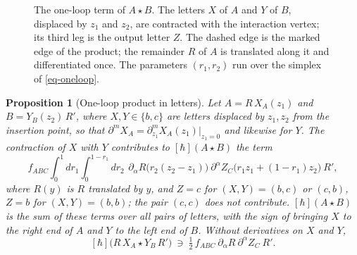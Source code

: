 \documentclass[11pt]{article}
\numberwithin{equation}{section}
\numberwithin{figure}{section}
\numberwithin{table}{section}
\newtheorem{proposition}[theorem]{Proposition}
\theoremstyle{definition}
\begin{document}
\begin{figure}[H]
\centering
{}
\caption{The one-loop term of $A\star B$. The letters $X$ of $A$ and $Y$ of $B$, displaced by $z_1$ and $z_2$, are contracted with the interaction vertex; its third leg is the output letter $Z$. The dashed edge is the marked edge of the product; the remainder $R$ of $A$ is translated along it and differentiated once. The parameters $(r_1,r_2)$ run over the simplex of \eqref{eq-oneloop}.}
\label{fig-triangle}
\end{figure}

\begin{proposition}[One-loop product in letters]\label{prop-oneloop}
Let $A=R\,X_A(z_1)$ and $B=Y_B(z_2)\,R'$, where $X,Y\in\{b,c\}$ are letters displaced by $z_1,z_2$ from the insertion point, so that $\partial^mX_A=\partial_{z_1}^mX_A(z_1)|_{z_1=0}$ and likewise for $Y$. The contraction of $X$ with $Y$ contributes to $[\hbar](A\star B)$ the term
\begin{equation}\label{eq-oneloop}
f_{ABC}\int_0^1\!dr_1\int_0^{1-r_1}\!dr_2\ \,
\partial_\alpha R\big(r_2(z_2-z_1)\big)\ \partial^\alpha Z_C\big(r_1z_1+(1-r_1)z_2\big)\ R',
\end{equation}
where $R(y)$ is $R$ translated by $y$, and $Z=c$ for $(X,Y)=(b,c)$ or $(c,b)$, $Z=b$ for $(X,Y)=(b,b)$; the pair $(c,c)$ does not contribute. $[\hbar](A\star B)$ is the sum of these terms over all pairs of letters, with the sign of bringing $X$ to the right end of $A$ and $Y$ to the left end of $B$. Without derivatives on $X$ and $Y$,
\begin{equation}\label{eq-oneloop-zero}
[\hbar]\big(R\,X_A\star Y_B\,R'\big)\ \ni\ \tfrac12\,f_{ABC}\ \partial_\alpha R\ \partial^\alpha Z_C\ R' .
\end{equation}
\end{proposition}
\end{document}
